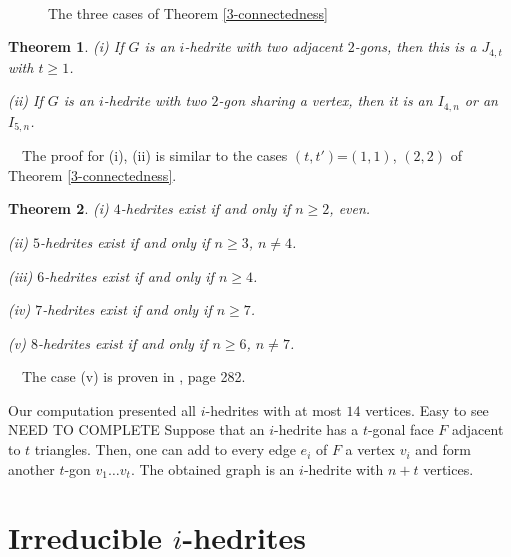 \documentclass[12pt]{article}
\newtheorem{theor}{Theorem}
\newcommand{\proof}{\noindent{\bf Proof.}\ \ }
\begin{document}
\begin{figure}
\centering
\mbox{
}
\caption{The three cases of Theorem \ref{3-connectedness}}
\label{fig:TheThreeCases}
\end{figure}



\begin{theor}
(i) If $G$ is an $i$-hedrite with two adjacent $2$-gons, then this is a $J_{4,t}$ with $t\geq 1$.

(ii) If $G$ is an $i$-hedrite with two $2$-gon sharing a vertex, then it is an $I_{4,n}$ or an $I_{5,n}$.

\end{theor}

\proof The proof for (i), (ii) is similar to the cases $(t,t')$=$(1,1)$, $(2,2)$ of Theorem \ref{3-connectedness}.




\begin{theor}

(i) $4$-hedrites exist if and only if $n\geq 2$, even.

(ii) $5$-hedrites exist if and only if $n\geq 3$, $n\not= 4$.

(iii) $6$-hedrites exist if and only if $n\geq 4$.

(iv) $7$-hedrites exist if and only if $n\geq 7$.

(v) $8$-hedrites exist if and only if $n\geq 6$, $n\not= 7$.

\end{theor}
\proof The case (v) is proven in \cite{Gr}, page 282.

Our computation presented all $i$-hedrites with at most $14$ vertices. Easy to see NEED TO COMPLETE
Suppose that an $i$-hedrite has a $t$-gonal face $F$ adjacent to $t$ triangles. Then, one can add to every edge $e_i$ of $F$ a vertex $v_i$ and form another $t$-gon $v_1\dots v_t$. The obtained graph is an $i$-hedrite with $n+t$ vertices.




\section{Irreducible $i$-hedrites}
\end{document}
